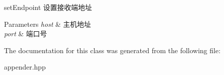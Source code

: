 set\+Endpoint 设置接收端地址 


\begin{DoxyParams}{Parameters}
{\em host} & 主机地址 \\
\hline
{\em port} & 端口号 \\
\hline
\end{DoxyParams}


The documentation for this class was generated from the following file\+:\begin{DoxyCompactItemize}
\item 
appender.\+hpp\end{DoxyCompactItemize}
